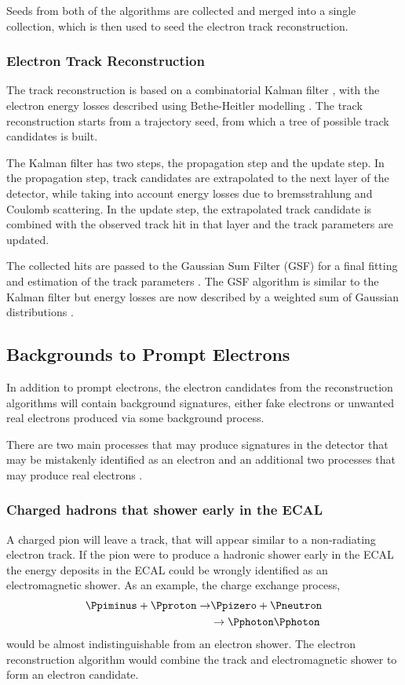Seeds from both of the algorithms are collected and merged into a single
collection, which is then used to seed the electron track reconstruction.

\subsubsection{Electron Track Reconstruction}
The track reconstruction is based on a combinatorial Kalman filter \cite{kalman},
with the electron energy losses described using Bethe-Heitler
modelling \cite{bethe}.
The track reconstruction starts from a trajectory seed, from which a tree of
possible track candidates is built. 

The Kalman filter has two steps, the propagation step and the update step. In
the propagation step, track candidates are extrapolated to the next layer of the
detector, while taking into account energy losses due to bremsstrahlung and
Coulomb scattering.  In the update step, the extrapolated track candidate is
combined with the observed track hit in that layer and the track parameters are
updated. 

The collected hits are passed to the Gaussian Sum Filter (GSF) for a final
fitting and estimation of the track parameters \cite{cmsgsf}. The {GSF}
algorithm is similar to the Kalman filter but energy losses are now described by
a weighted sum of Gaussian distributions \cite{gsf}.

\subsection{Backgrounds to Prompt Electrons}
In addition to prompt electrons, the electron candidates from the reconstruction
algorithms will contain background signatures, either fake electrons or unwanted
real electrons produced via some background process.

There are two main processes that may produce signatures in the detector that
may be mistakenly identified as an electron and an additional
two processes that may produce real electrons \cite{nikos}.

\subsubsection{Charged hadrons that shower early in the ECAL}
A charged pion will leave a track, that will appear similar to a non-radiating
electron track.
If the pion were to produce a hadronic shower early in the ECAL
the energy deposits in the ECAL could be wrongly identified as an
electromagnetic shower.
As an example, the charge exchange process,
\begin{align}
\Ppiminus + \Pproton \to &\Ppizero + \Pneutron \nonumber \\
                         &\to \Pphoton\Pphoton
\end{align}
would be almost indistinguishable from an electron shower.
The electron reconstruction algorithm would combine the
track and electromagnetic shower to form an electron candidate\cite{nikos}.

